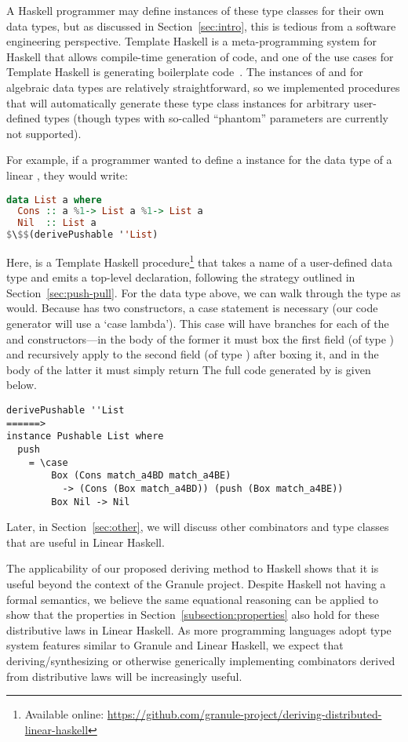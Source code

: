A Haskell programmer may define instances of these type classes
for their own data types, but as discussed in Section~\ref{sec:intro}, this is
tedious from a software engineering perspective.
%
Template Haskell is a meta-programming system for Haskell that allows
compile-time generation of code, and one of the use cases for Template Haskell
is generating boilerplate code~\cite{template-haskell}. The instances of
 and  for algebraic data types are relatively
straightforward, so we implemented procedures that will automatically generate
these type class instances for arbitrary user-defined types (though types with
so-called ``phantom'' parameters are currently not supported).

For example, if a programmer wanted to define a  instance for
the data type of a linear , they would write:
%
\begin{lstlisting}[language=Haskell,mathescape=true]
data List a where
  Cons :: a %1-> List a %1-> List a
  Nil  :: List a
$\$$(derivePushable ''List)
\end{lstlisting}
%
Here,  is a Template Haskell procedure\footnote{Available online: \url{https://github.com/granule-project/deriving-distributed-linear-haskell}} that takes a name
of a user-defined data type and emits a top-level declaration, following the
strategy outlined in Section~\ref{sec:push-pull}.
%
For the  data type above, we can walk through the type as
 would. Because  has two constructors, a case statement
is necessary (our code generator will use a `case lambda'). This case will have branches for each
of the  and  constructors---in the body of the former it must box the
first field (of type ) and recursively apply  to the second field (of
type ) after boxing it, and in the body of the latter it must simply return
%
The full code generated by  is given below.
\begin{lstlisting}
derivePushable ''List
======>
instance Pushable List where
  push
    = \case
        Box (Cons match_a4BD match_a4BE)
          -> (Cons (Box match_a4BD)) (push (Box match_a4BE))
        Box Nil -> Nil
\end{lstlisting}
%
Later, in Section~\ref{sec:other}, we will discuss other combinators and type classes that are
useful in Linear Haskell.

The applicability of our proposed deriving method to Haskell shows that it is
useful beyond the context of the Granule project. Despite Haskell not having a formal semantics, we believe the same equational reasoning can be applied to show that the properties in Section~\ref{subsection:properties} also hold for these distributive laws in Linear Haskell. As more programming languages
adopt type system features similar to Granule and Linear Haskell, we expect that
deriving/synthesizing or otherwise generically implementing combinators derived
from distributive laws will be increasingly useful.

